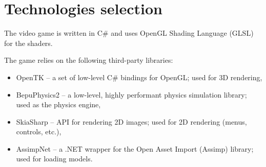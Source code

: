 \section{Technologies selection}
The video game is written in C\# and uses OpenGL Shading Language (GLSL) for the shaders.

The game relies on the following third-party libraries:
\begin{itemize}
    \item OpenTK -- a set of low-level C\# bindings for OpenGL; used for 3D rendering,
    \item BepuPhysics2 -- a low-level, highly performant physics simulation library; used as the physics engine,
    \item SkiaSharp -- API for rendering 2D images; used for 2D rendering (menus, controls, etc.),
    \item AssimpNet -- a .NET wrapper for the Open Asset Import (Assimp) library; used for loading models.
\end{itemize}